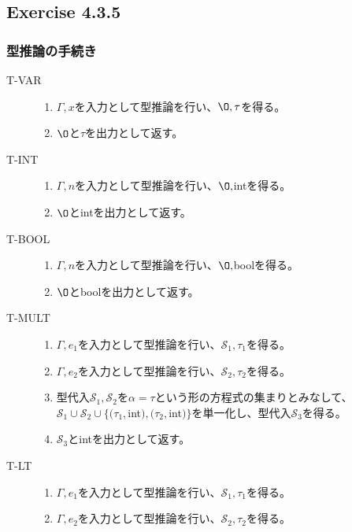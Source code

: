 \documentclass{jarticle}
\begin{document}
\subsection{Exercise 4.3.5}
\subsubsection{型推論の手続き}
\begin{description}
\item[T-VAR] 
  \begin{enumerate}
  \item $\Gamma, x$を入力として型推論を行い、$\O,\tau$を得る。
　　\item $\O$と$\tau$を出力として返す。
  \end{enumerate}
\item[T-INT]
  \begin{enumerate}
  \item $\Gamma, n$を入力として型推論を行い、$\O,$intを得る。
　　\item $\O$とintを出力として返す。
  \end{enumerate}
\item[T-BOOL]
  \begin{enumerate}
  \item $\Gamma, n$を入力として型推論を行い、$\O,$boolを得る。
　　\item $\O$とboolを出力として返す。
  \end{enumerate}
\item[T-MULT]
  \begin{enumerate}
  \item $\Gamma,e_{1}$を入力として型推論を行い、$\mathcal{S}_{1},\tau_{1}$を得る。
　　\item $\Gamma,e_{2}$を入力として型推論を行い、$\mathcal{S}_{2},\tau_{2}$を得る。
　　\item 型代入$\mathcal{S}_{1},\mathcal{S}_{2}$を$\alpha=\tau$という形の方程式の集まりとみなして、$\mathcal{S}_{1} \cup \mathcal{S}_{2} \cup \{(\tau_{1},$int$),(\tau_{2},$int$)\}$を単一化し、型代入$\mathcal{S}_{3}$を得る。
  \item $\mathcal{S}_{3}$とintを出力として返す。
  \end{enumerate}
\item[T-LT]
  \begin{enumerate}
  \item $\Gamma,e_{1}$を入力として型推論を行い、$\mathcal{S}_{1},\tau_{1}$を得る。
　　\item $\Gamma,e_{2}$を入力として型推論を行い、$\mathcal{S}_{2},\tau_{2}$を得る。

\end{enumerate}
\end{description}
\end{document}
